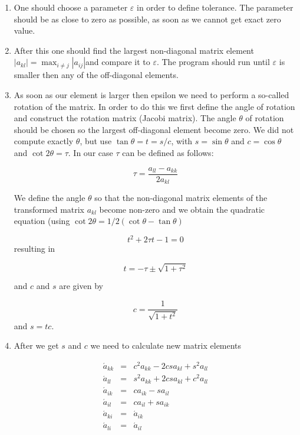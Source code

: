 \documentclass[10pt]{article}
\begin{document}
\begin{enumerate}
\item One should choose a parameter $\varepsilon $ in order to define tolerance. The parameter should be as close to zero as possible, as soon as we cannot get exact zero value.

\item After this one should find the largest non-diagonal matrix element $\left\vert
a_{kl}\right\vert =\max\nolimits_{i\neq j}\left\vert a_{ij}\right\vert $and
compare it to $\varepsilon $. The program should run until $\varepsilon $ is smaller then any of the off-diagonal elements.

\item As soon as our element is larger then epsilon we need to perform a so-called rotation of the matrix. In order to do this we first define the angle of rotation and construct the rotation matrix (Jacobi matrix). The angle $\theta $ of rotation should be chosen so the largest off-diagonal element become zero.
We did not compute exactly $\theta $, but use $%
\tan \theta =t=s/c$, with $s=\sin \theta $ and $c=\cos \theta $ and $\cot
2\theta =\tau $. 
In our case $\tau $ can be defined as follows:

\begin{equation}
\tau =\frac{a_{ll}-a_{kk}}{2a_{kl}}
\end{equation}%

We define the angle $\theta $ so that the non-diagonal matrix
elements of the transformed matrix $a_{kl}$ become non-zero and we obtain
the quadratic equation (using $\cot 2\theta =1/2(\cot \theta -\tan \theta )$

\begin{equation}
t^{2}+2\tau t-1=0
\end{equation}
resulting in

\begin{equation}
t=-\tau \pm \sqrt{1+\tau ^{2}}
\end{equation}

and $c$ and $s$ are given by

\begin{equation}
c=\frac{1}{\sqrt{1+t^{2}}}
\end{equation}
and $s=tc$. 

\item 
After we get $s$ and $c$ we need to calculate new matrix elements



\begin{eqnarray*}
\acute{a}_{kk} &=&c^{2}a_{kk}-2csa_{kl}+s^{2}a_{ll} \\
\acute{a}_{ll} &=&s^{2}a_{kk}+2csa_{kl}+c^{2}a_{ll} \\
\acute{a}_{ik} &=&ca_{ik}-sa_{il} \\
\acute{a}_{il} &=&ca_{il}+sa_{ik} \\
\acute{a}_{ki} &=&\acute{a}_{ik} \\
\acute{a}_{li} &=&\acute{a}_{il}
\end{eqnarray*}


\end{enumerate}
\end{document}
